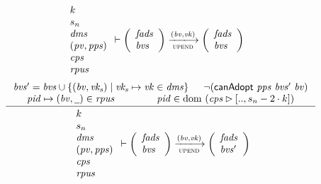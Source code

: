 \begin{figure}[htb]
\begin{equation}
{{\begin{array}{l}
          k\\
          s_n\\
          \var{dms}\\
          (\var{pv}, \var{pps})\\
          \var{cps}\\
          \var{rpus}
        \end{array}
      }
      \vdash
      {
        \left(
          \begin{array}{l}
            \var{fads}\\
            \var{bvs}
          \end{array}
        \right)
      }
      \trans{upend}{(\var{bv}, \var{vk})}
      {
        \left(
          \begin{array}{l}
            \var{fads}\\
            \var{bvs}
          \end{array}
        \right)
      }
    }
  \end{equation}
  \nextdef
  \begin{equation}
    \label{eq:rule:up-cant-adopt}
    \inference
    {
      \var{bvs'} = \var{bvs} \cup
      \{ (\var{bv}, \var{vk_s}) \mid \var{vk_s} \mapsto \var{vk} \in \var{dms} \}
      & \neg (\fun{canAdopt}~\var{pps}~\var{bvs'}~\var{bv}) \\
      \var{pid} \mapsto (\var{bv}, \wcard) \in \var{rpus}
      & \var{pid} \in \dom~(\var{cps} \restrictrange [.., s_n - 2 \cdot k])
    }
    {
      {
        \begin{array}{l}
          k\\
          s_n\\
          \var{dms}\\
          (\var{pv}, \var{pps})\\
          \var{cps}\\
          \var{rpus}
        \end{array}
      }
      \vdash
      {
        \left(
          \begin{array}{l}
            \var{fads}\\
            \var{bvs}
          \end{array}
        \right)
      }
      \trans{upend}{(\var{bv}, \var{vk})}
      {
        \left(
          \begin{array}{l}
            \var{fads}\\
            \var{bvs'}
          \end{array}
        \right)
      }
    }
  \end{equation}

\end{figure}
